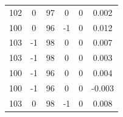 \documentclass[a4paper, 12pt]{article}
\begin{document}
\begin{table}[H]
\begin{tabular}{@{}cccccc@{}}
    102          & 0            & 97       & 0        & 0        & 0.002      \\
    100          & 0            & 96       & -1       & 0        & 0.012      \\
    103          & -1           & 98       & 0        & 0        & 0.007      \\
    103          & -1           & 98       & 0        & 0        & 0.003      \\
    100          & -1           & 96       & 0        & 0        & 0.004      \\
    100          & -1           & 96       & 0        & 0        & -0.003     \\
    103          & 0            & 98       & -1       & 0        & 0.008      \\ \bottomrule
    \end{tabular}
    \end{table}
\end{document}
